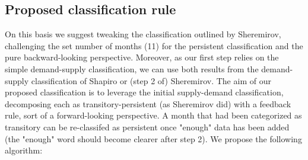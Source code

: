 \subsection{Proposed classification rule}

\quad On this basis we suggest tweaking the classification outlined by Sheremirov, challenging the set number of months (11) for the persistent classification and the pure backward-looking perspective. 
Moreover, as our first step relies on the simple demand-supply classification, we can use both results from the demand-supply classification of Shapiro or (step 2 of) Sheremirov.
The aim of our proposed classification is to leverage the initial supply-demand classification, decomposing each as transitory-persistent (as Sheremirov did) with a feedback rule, sort of a forward-looking perspective. 
A month that had been categorized as transitory can be re-classifed as persistent once "enough" data has been added (the "enough" word should become clearer after step 2).
We propose the following algorithm:
